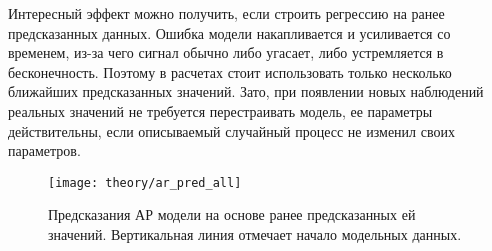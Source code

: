 Интересный эффект можно получить, если строить регрессию на ранее предсказанных данных. Ошибка модели накапливается и усиливается со временем, из-за чего сигнал обычно либо угасает, либо устремляется в бесконечность. Поэтому в расчетах стоит использовать только несколько ближайших предсказанных значений. Зато, при появлении новых наблюдений реальных значений не требуется перестраивать модель, ее параметры действительны, если описываемый случайный процесс не изменил своих параметров.

\begin{figure}[h]
  \centering
  \texttt{[image: theory/ar\_pred\_all]}
  \caption{Предсказания АР модели на основе ранее предсказанных ей значений. Вертикальная линия отмечает начало модельных данных.}
  \label{fig:theory:ar_pred_all}
\end{figure}
